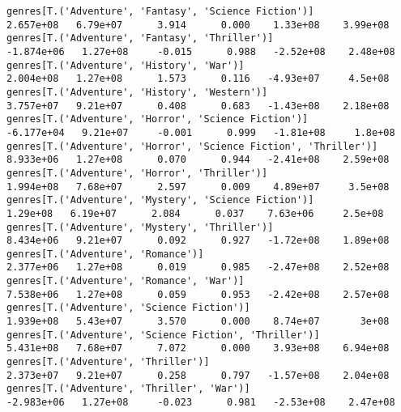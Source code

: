 \documentclass[11pt]{article}
\begin{document}
\begin{Verbatim}[commandchars=\\\{\}]
genres[T.('Adventure', 'Fantasy', 'Science Fiction')]                                                         2.657e+08   6.79e+07      3.914      0.000    1.33e+08    3.99e+08
genres[T.('Adventure', 'Fantasy', 'Thriller')]                                                               -1.874e+06   1.27e+08     -0.015      0.988   -2.52e+08    2.48e+08
genres[T.('Adventure', 'History', 'War')]                                                                     2.004e+08   1.27e+08      1.573      0.116   -4.93e+07     4.5e+08
genres[T.('Adventure', 'History', 'Western')]                                                                 3.757e+07   9.21e+07      0.408      0.683   -1.43e+08    2.18e+08
genres[T.('Adventure', 'Horror', 'Science Fiction')]                                                         -6.177e+04   9.21e+07     -0.001      0.999   -1.81e+08     1.8e+08
genres[T.('Adventure', 'Horror', 'Science Fiction', 'Thriller')]                                              8.933e+06   1.27e+08      0.070      0.944   -2.41e+08    2.59e+08
genres[T.('Adventure', 'Horror', 'Thriller')]                                                                 1.994e+08   7.68e+07      2.597      0.009    4.89e+07     3.5e+08
genres[T.('Adventure', 'Mystery', 'Science Fiction')]                                                          1.29e+08   6.19e+07      2.084      0.037    7.63e+06     2.5e+08
genres[T.('Adventure', 'Mystery', 'Thriller')]                                                                8.434e+06   9.21e+07      0.092      0.927   -1.72e+08    1.89e+08
genres[T.('Adventure', 'Romance')]                                                                            2.377e+06   1.27e+08      0.019      0.985   -2.47e+08    2.52e+08
genres[T.('Adventure', 'Romance', 'War')]                                                                     7.538e+06   1.27e+08      0.059      0.953   -2.42e+08    2.57e+08
genres[T.('Adventure', 'Science Fiction')]                                                                    1.939e+08   5.43e+07      3.570      0.000    8.74e+07       3e+08
genres[T.('Adventure', 'Science Fiction', 'Thriller')]                                                        5.431e+08   7.68e+07      7.072      0.000    3.93e+08    6.94e+08
genres[T.('Adventure', 'Thriller')]                                                                           2.373e+07   9.21e+07      0.258      0.797   -1.57e+08    2.04e+08
genres[T.('Adventure', 'Thriller', 'War')]                                                                   -2.983e+06   1.27e+08     -0.023      0.981   -2.53e+08    2.47e+08

\end{Verbatim}
\end{document}
